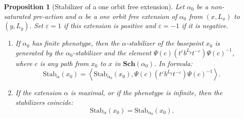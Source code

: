 \documentclass[12pt]{article}
\numberwithin{equation}{section}
\newtheorem{proposition}[equation]{Proposition}
\theoremstyle{definition}
\newcommand{\la}{\left\langle}
\newcommand{\ra}{\right\rangle}
\newcommand{\Stab}{\mathrm{Stab}}
\newcommand{\Sch}{\mathbf{Sch}}
\newcommand\Schreier{\Sch}
\begin{document}
	\begin{proposition}[Stabilizer of a one orbit free extension]
	    \label{prop: stabilizer of a one orbit free extension}
		\label{prop: stab any one orbit free extension}
		Let \( \alpha_0 \) be a non-saturated pre-action and
		\( \alpha \) be a one orbit free extension of \( \alpha_0 \) from $(x,L_x)$ to $(y,L_y)$.
		Set $\varepsilon = 1$ if this extension is positive and $\varepsilon = -1$ if it is negative.
		\begin{enumerate}
			\item If \( \alpha_0 \) has finite phenotype, 
			then the \( \alpha \)-stabilizer of the basepoint \( x_0 \) is generated by the \( \alpha_0 \)-stabilizer and the element
			$\Psi(c)\left(t^\varepsilon b^{L_y} t^{-\varepsilon}\right)\Psi(c)^{-1}$,
			where \( c \) is any path from \( x_0 \) to \( x \) in $\Schreier(\alpha_0)$. In formula:
			\[
				\Stab_\alpha(x_0)=\la \Stab_{\alpha_0}(x_0), \Psi(c)\left(t^\varepsilon b^{L_y} t^{-\varepsilon}\right)\Psi(c)^{-1}\ra .
			\]

			\item If the extension \( \alpha \) is maximal, or if the phenotype is infinite,
			then the stabilizers coincide:
			\[
				\Stab_\alpha(x_0)=\Stab_{\alpha_0}(x_0).
			\] 
		\end{enumerate}
	\end{proposition}
\end{document}
